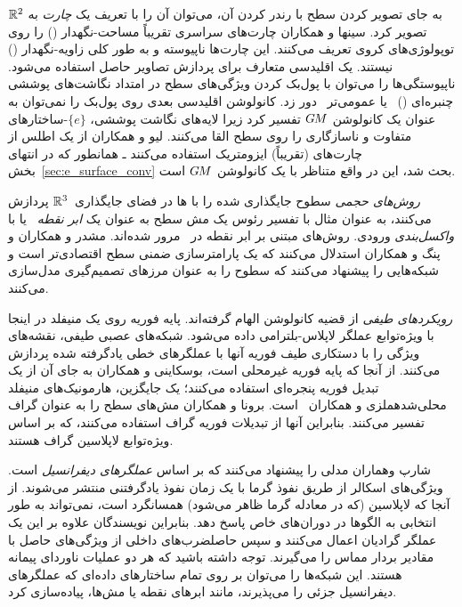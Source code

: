 به جای تصویر کردن سطح با رندر کردن آن، می‌توان آن را با تعریف یک \emph{چارت} به $\mathbb{R}^2$ تصویر کرد.
سینها و همکاران\cite{sinha2016deep} چارت‌های سراسری تقریباً مساحت-نگهدار () را روی توپولوژی‌های کروی تعریف می‌کنند.
این چارت‌ها ناپیوسته و به طور کلی زاویه-نگهدار () نیستند.
یک  اقلیدسی متعارف برای پردازش تصاویر حاصل استفاده می‌شود.
ناپیوستگی‌ها را می‌توان با پول‌بک کردن ویژگی‌های سطح در امتداد نگاشت‌های پوششی چنبره‌ای ()~\cite{maron2017convolutional} یا عمومی‌تر~\cite{haim2018surface,benhamu2018multichart} دور زد.
کانولوشن اقلیدسی بعدی روی پول‌بک را نمی‌توان به عنوان یک کانولوشن $G\mkern-1.4muM$ تفسیر کرد زیرا لایه‌های نگاشت پوششی، $\{e\}$-ساختارهای متفاوت و ناسازگاری را روی سطح القا می‌کنند.
لیو و همکاران\cite{li2019crossAtlas} از یک اطلس از چارت‌های (تقریباً) ایزومتریک استفاده می‌کنند ـ همانطور که در انتهای بخش~\ref{sec:e_surface_conv} بحث شد، این در واقع متناظر با یک کانولوشن $G\mkern-1.4muM$ است.


\emph{روش‌های حجمی} سطوح جایگذاری شده را با ها در فضای جایگذاری~$\mathbb{R}^3$ پردازش می‌کنند، به عنوان مثال با تفسیر رئوس یک مش سطح به عنوان یک \emph{ابر نقطه}~\cite{qi2017pointnet,qi2017pointnet++,thomas2019kpconv} یا با \emph{واکسل‌بندی} ورودی.
روش‌های مبتنی بر ابر نقطه در~\cite{guo2020deep} مرور شده‌اند.
مشدر و همکاران\cite{mescheder2019occupancyNets} و پنگ و همکاران\cite{peng2020occupancyCNNs} استدلال می‌کنند که یک پارامترسازی ضمنی سطح اقتصادی‌تر است و شبکه‌هایی را پیشنهاد می‌کنند که سطوح را به عنوان مرزهای تصمیم‌گیری مدل‌سازی می‌کنند.


\emph{رویکردهای طیفی} از قضیه کانولوشن الهام گرفته‌اند.
پایه فوریه روی یک منیفلد در اینجا با ویژه‌توابع عملگر لاپلاس-بلترامی داده می‌شود.
شبکه‌های عصبی طیفی، نقشه‌های ویژگی را با دستکاری طیف فوریه آنها با عملگرهای خطی یادگرفته شده پردازش می‌کنند.
از آنجا که پایه فوریه غیرمحلی است، بوسکاینی و همکاران\cite{boscaini2015learning} به جای آن از یک تبدیل فوریه پنجره‌ای استفاده می‌کنند؛ یک جایگزین، هارمونیک‌های منیفلد محلی‌شدهملزی و همکاران~\cite{melzi2018localized} است.
برونا و همکاران\cite{bruna2013spectral} مش‌های سطح را به عنوان گراف تفسیر می‌کنند.
بنابراین آنها از تبدیلات فوریه گراف استفاده می‌کنند، که بر اساس ویژه‌توابع لاپلاسین گراف هستند.


شارپ وهماران\cite{sharp2020diffusion} مدلی را پیشنهاد می‌کنند که بر اساس \emph{عملگرهای دیفرانسیل} است.
ویژگی‌های اسکالر از طریق نفوذ گرما با یک زمان نفوذ یادگرفتنی منتشر می‌شوند.
از آنجا که لاپلاسین (که در معادله گرما ظاهر می‌شود) همسانگرد است، نمی‌تواند به طور انتخابی به الگوها در دوران‌های خاص پاسخ دهد.
بنابراین نویسندگان علاوه بر این یک عملگر گرادیان اعمال می‌کنند و سپس حاصلضرب‌های داخلی از ویژگی‌های حاصل با مقادیر بردار مماس را می‌گیرند.
توجه داشته باشید که هر دو عملیات ناوردای پیمانه هستند.
این شبکه‌ها را می‌توان بر روی تمام ساختارهای داده‌ای که عملگرهای دیفرانسیل جزئی را می‌پذیرند، مانند ابرهای نقطه یا مش‌ها، پیاده‌سازی کرد.


